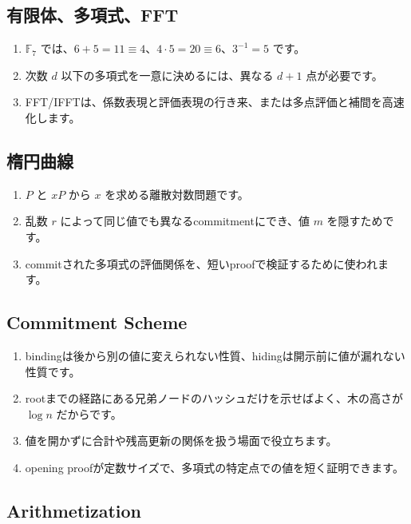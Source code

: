 \documentclass[a4paper,11pt]{ltjsarticle}
\newcommand{\F}{\mathbb{F}}
\begin{document}
\subsection{有限体、多項式、FFT}

\begin{enumerate}
  \item \(\F_7\) では、\(6+5=11\equiv4\)、\(4\cdot5=20\equiv6\)、\(3^{-1}=5\) です。
  \item 次数 \(d\) 以下の多項式を一意に決めるには、異なる \(d+1\) 点が必要です。
  \item FFT/IFFTは、係数表現と評価表現の行き来、または多点評価と補間を高速化します。
\end{enumerate}

\subsection{楕円曲線}

\begin{enumerate}
  \item \(P\) と \(xP\) から \(x\) を求める離散対数問題です。
  \item 乱数 \(r\) によって同じ値でも異なるcommitmentにでき、値 \(m\) を隠すためです。
  \item commitされた多項式の評価関係を、短いproofで検証するために使われます。
\end{enumerate}

\subsection{Commitment Scheme}

\begin{enumerate}
  \item bindingは後から別の値に変えられない性質、hidingは開示前に値が漏れない性質です。
  \item rootまでの経路にある兄弟ノードのハッシュだけを示せばよく、木の高さが \(\log n\) だからです。
  \item 値を開かずに合計や残高更新の関係を扱う場面で役立ちます。
  \item opening proofが定数サイズで、多項式の特定点での値を短く証明できます。
\end{enumerate}

\subsection{Arithmetization}
\end{document}

